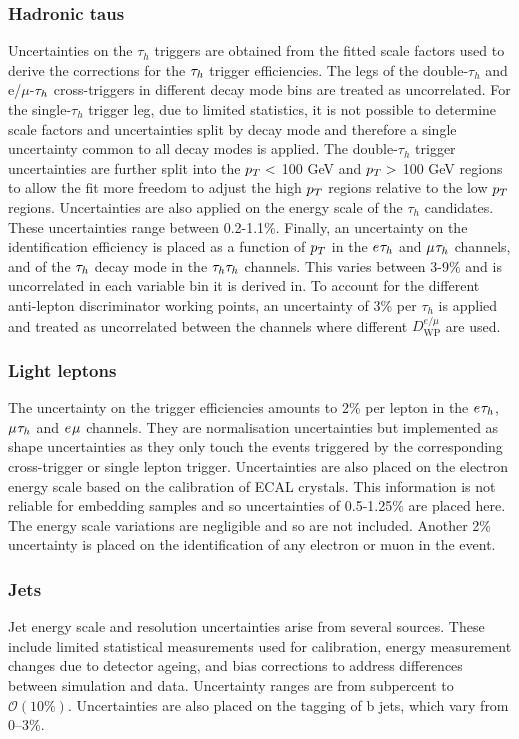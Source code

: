 \subsubsection{Hadronic taus}
Uncertainties on the $\tau_h$ triggers are obtained from the fitted scale factors used to derive the corrections for the $\tau_{h}$ trigger efficiencies.
The legs of the double-$\tau_h$ and e/$\mu$-$\tau_{h}$ cross-triggers in different decay mode bins are treated as uncorrelated.
For the single-$\tau_h$ trigger leg, due to limited statistics, it is not possible to determine scale factors and uncertainties split by decay mode and therefore a single uncertainty common to all decay modes is applied.
The double-$\tau_h$ trigger uncertainties are further split into the $p_{T}<$ 100 GeV and $p_{T}>$ 100 GeV regions to allow the fit more freedom to adjust the high $p_{T}$ regions relative to the low $p_{T}$ regions.
Uncertainties are also applied on the energy scale of the $\tau_h$ candidates. 
These uncertainties range between 0.2-1.1\%. 
Finally, an uncertainty on the identification efficiency is placed as a function of $p_{T}$ in the $e_{}\tau_{h}$ and $\mu_{}\tau_{h}$ channels, and of the $\tau_{h}$ decay mode in the $\tau_{h}\tau_{h}$ channels. 
This varies between 3-9\% and is uncorrelated in each variable bin it is derived in.
To account for the different anti-lepton discriminator working points, an uncertainty of 3\% per $\tau_h$ is applied and treated as uncorrelated between the channels where different $D_{\text{WP}}^{e/\mu}$ are used.

\subsubsection{Light leptons}
The uncertainty on the trigger efficiencies amounts to 2\% per lepton in the $e_{}\tau_{h}$, $\mu_{}\tau_{h}$ and $e_{}\mu_{}$ channels.
They are normalisation uncertainties but implemented as shape uncertainties as they only touch the events triggered by the corresponding cross-trigger or single lepton trigger.
Uncertainties are also placed on the electron energy scale based on the calibration of \ac{ECAL} crystals.
This information is not reliable for embedding samples and so uncertainties of 0.5-1.25\% are placed here. 
The energy scale variations are negligible and so are not included.
Another 2\% uncertainty is placed on the identification of any electron or muon in the event.

\subsubsection{Jets}
Jet energy scale and resolution uncertainties arise from several sources. 
These include limited statistical measurements used for calibration, energy measurement changes due to detector ageing, and bias corrections to address differences between simulation and data. 
Uncertainty ranges are from subpercent to $\mathcal{O}(10\%)$.
Uncertainties are also placed on the tagging of b jets, which vary from 0--3\%.

